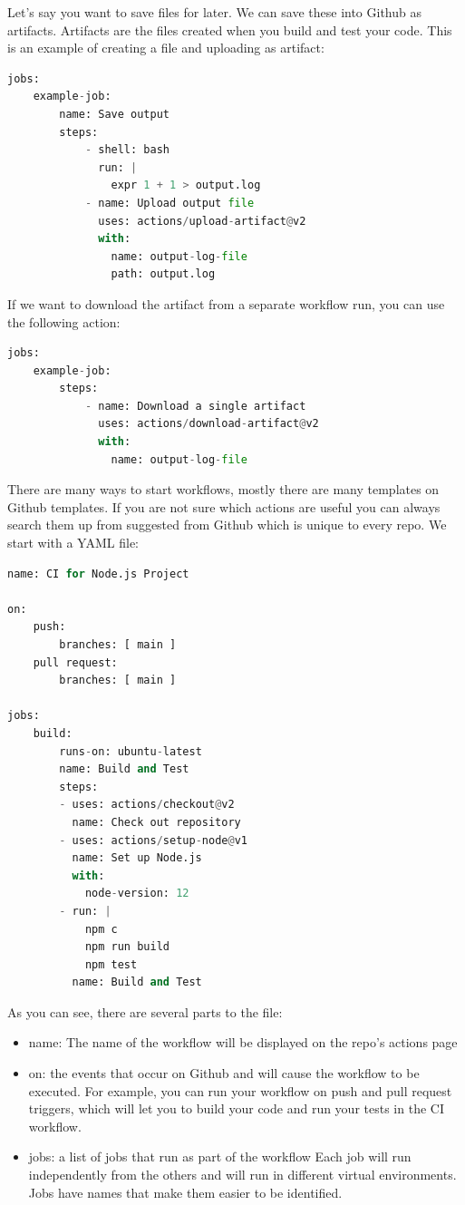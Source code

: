 \documentclass[11pt]{article}
\begin{document}
\noindent Let's say you want to save files for later. We can save these into Github as artifacts. Artifacts are the files created when you build and test your code. This is an example of creating a file and uploading as artifact:

\begin{lstlisting}[language=python]
jobs:
    example-job:
        name: Save output
        steps:
            - shell: bash
              run: |
                expr 1 + 1 > output.log
            - name: Upload output file
              uses: actions/upload-artifact@v2
              with:
                name: output-log-file
                path: output.log
\end{lstlisting}

\noindent If we want to download the artifact from a separate workflow run, you can use the following action:

\begin{lstlisting}[language=python]
jobs:
    example-job:
        steps:
            - name: Download a single artifact
              uses: actions/download-artifact@v2
              with:
                name: output-log-file
\end{lstlisting}

\noindent There are many ways to start workflows, mostly there are many templates on Github templates. If you are not sure which actions are useful you can always search them up from suggested from Github which is unique to every repo. We start with a YAML file:

\begin{lstlisting}[language=python]
name: CI for Node.js Project

on: 
    push: 
        branches: [ main ]
    pull request:
        branches: [ main ]

jobs:
    build:
        runs-on: ubuntu-latest
        name: Build and Test
        steps:
        - uses: actions/checkout@v2
          name: Check out repository
        - uses: actions/setup-node@v1
          name: Set up Node.js
          with:
            node-version: 12
        - run: |
            npm c
            npm run build
            npm test
          name: Build and Test
\end{lstlisting}

\noindent As you can see, there are several parts to the file:
\begin{itemize}
    \item[] name: The name of the workflow will be displayed on the repo's actions page
    \item[] on: the events that occur on Github and will cause the workflow to be executed. For example, you can run your workflow on push and pull request triggers, which will let you to build your code and run your tests in the CI workflow. 
    \item[] jobs: a list of jobs that run as part of the workflow Each job will run independently from the others and will run in different virtual environments. Jobs have names that make them easier to be identified. 
\end{itemize}
\end{document}
